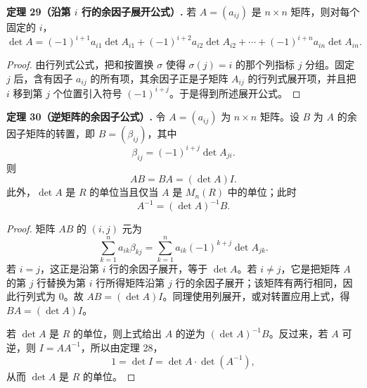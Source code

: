 \noindent\textbf{定理 29（沿第 $i$ 行的余因子展开公式）.} 若 $A=(a_{ij})$ 是 $n\times n$ 矩阵，则对每个固定的 $i$，
\[
\det A=
(-1)^{i+1}a_{i1}\det A_{i1}+
(-1)^{i+2}a_{i2}\det A_{i2}+\cdots+
(-1)^{i+n}a_{in}\det A_{in}.
\]

\begin{proof}
由行列式公式，把和按置换 $\sigma$ 使得 $\sigma(j)=i$ 的那个列指标 $j$ 分组。固定 $j$ 后，含有因子 $a_{ij}$ 的所有项，其余因子正是子矩阵 $A_{ij}$ 的行列式展开项，并且把 $i$ 移到第 $j$ 个位置引入符号 $(-1)^{i+j}$。于是得到所述展开公式。
\end{proof}

\noindent\textbf{定理 30（逆矩阵的余因子公式）.} 令 $A=(a_{ij})$ 为 $n\times n$ 矩阵。设 $B$ 为 $A$ 的余因子矩阵的转置，即 $B=(\beta_{ij})$，其中
\[
\beta_{ij}=(-1)^{i+j}\det A_{ji}.
\]
则
\[
AB=BA=(\det A)I.
\]
此外，$\det A$ 是 $R$ 的单位当且仅当 $A$ 是 $M_n(R)$ 中的单位；此时
\[
A^{-1}=(\det A)^{-1}B.
\]

\begin{proof}
矩阵 $AB$ 的 $(i,j)$ 元为
\[
\sum_{k=1}^n a_{ik}\beta_{kj}
=
\sum_{k=1}^n a_{ik}(-1)^{k+j}\det A_{jk}.
\]
若 $i=j$，这正是沿第 $i$ 行的余因子展开，等于 $\det A$。若 $i\neq j$，它是把矩阵 $A$ 的第 $j$ 行替换为第 $i$ 行所得矩阵沿第 $j$ 行的余因子展开；该矩阵有两行相同，因此行列式为 $0$。故 $AB=(\det A)I$。同理使用列展开，或对转置应用上式，得 $BA=(\det A)I$。

若 $\det A$ 是 $R$ 的单位，则上式给出 $A$ 的逆为 $(\det A)^{-1}B$。反过来，若 $A$ 可逆，则 $I=AA^{-1}$，所以由定理 28，
\[
1=\det I=\det A\cdot \det(A^{-1}),
\]
从而 $\det A$ 是 $R$ 的单位。
\end{proof}

